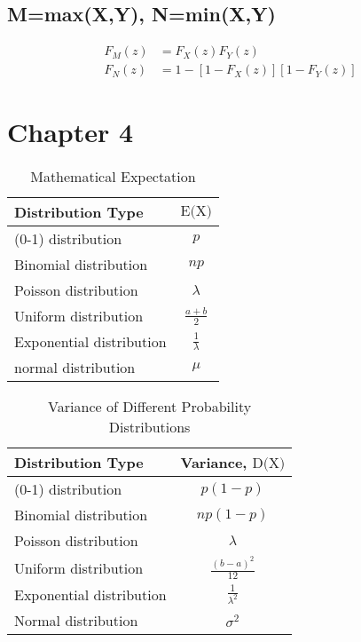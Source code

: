 \documentclass[12pt]{article}
\begin{document}
\subsection{M=max(X,Y), N=min(X,Y)}

\begin{align}
    F_M(z) &= F_X(z)F_Y(z)\\
    F_N(z) &= 1-[1-F_X(z)][1-F_Y(z)]
\end{align}

\section{Chapter 4}

\begin{table}[h]
    \centering
    \caption{Mathematical Expectation}
    \renewcommand{\arraystretch}{1.5}
    \begin{tabular}{p{}c} 
      \toprule
      \textbf{Distribution Type}  & \textbf{$\text{E(X)}$} \\
      \midrule
      (0-1) distribution & $p$ \\
      Binomial distribution & $np$ \\
      Poisson distribution & $\lambda$ \\
      Uniform distribution & $\frac{a+b}{2}$ \\
      Exponential distribution & $\frac{1}{\lambda}$ \\
      normal distribution & $\mu$ \\
      \bottomrule
    \end{tabular}
\end{table}

\begin{table}[h!]
    \centering
    \caption{Variance of Different Probability Distributions}
    \renewcommand{\arraystretch}{1.5}
    \begin{tabular}{p{}c} 
      \toprule
      \textbf{Distribution Type}  & \textbf{Variance, $\text{D(X)}$} \\
      \midrule
      (0-1) distribution & $p(1-p)$ \\
      Binomial distribution & $np(1-p)$ \\
      Poisson distribution & $\lambda$ \\
      Uniform distribution & $\frac{(b-a)^2}{12}$ \\
      Exponential distribution & $\frac{1}{\lambda^2}$ \\
      Normal distribution & $\sigma^2$ \\
      \bottomrule
    \end{tabular}
\end{table}
\end{document}
